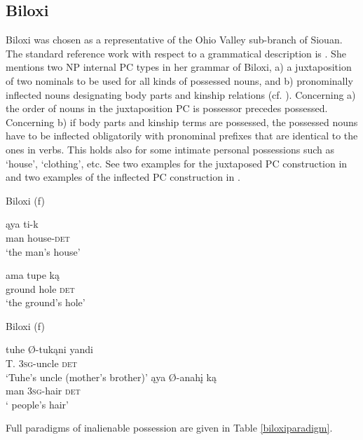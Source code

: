 \documentclass[output=paper]{LSP/langsci}
\begin{document}
\subsection{Biloxi}
Biloxi was chosen as a representative of the Ohio Valley sub-branch of Siouan. The standard reference work with respect to a grammatical description is \citet{Einaudi1976}. She mentions two NP internal PC types in her grammar of Biloxi, a) a juxtaposition of two nominals to be used for all kinds of possessed nouns, and b) pronominally inflected nouns designating body parts and kinship relations (cf. \citealt[57-68]{Einaudi1976}). Concerning a) the order of nouns in the juxtaposition PC is possessor precedes possessed. Concerning b) if body parts and kinship terms are possessed, the possessed nouns have to be inflected obligatorily with pronominal prefixes that are identical to the ones in verbs. This holds also for some intimate personal possessions such as `house', `clothing', etc. See two examples for the juxtaposed PC construction in  and two examples of the inflected PC construction in .

\ea Biloxi (\citealt[139]{Einaudi1976}f) \label{biloxihouse}

\ea
\gll \k{a}ya   ti-k		\\				
man house-\textsc{det} \\
\glt `the man's house'

\ex 
\gll ama tupe k\k{a} \\
ground hole \textsc{det} \\
\glt `the ground's hole'
\z \z

\ea	Biloxi (\citealt[139]{Einaudi1976}f) \label{biloxiuncle}

\ea \gll tuhe   Ø-tukąni       yandi	\\  
T.      \textsc{3sg}-uncle    \textsc{det} \\
\glt `Tuhe's uncle (mother's brother)'
\ex \gll ąya   Ø-anahį    k\k{a} \\
man \textsc{3sg}-hair   \textsc{det} \\
\glt `	people's hair'
\z \z

Full paradigms of inalienable possession are given in Table \ref{biloxiparadigm}.
\end{document}
